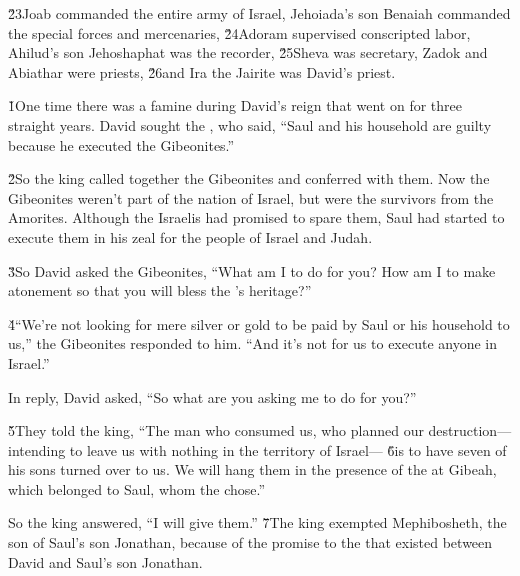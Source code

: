 \v{23}Joab commanded the entire army of Israel, Jehoiada's son Benaiah commanded the special forces and mercenaries, \v{24}Adoram supervised conscripted labor, Ahilud's son Jehoshaphat was the recorder, \v{25}Sheva was secretary, Zadok and Abiathar were priests, \v{26}and Ira the Jairite was David's priest.

\v{1}One time there was a famine during David's reign that went on for three straight years. David sought the , who said, ``Saul and his household are guilty because he executed the Gibeonites.''

\v{2}So the king called together the Gibeonites and conferred with them. Now the Gibeonites weren't part of the nation of Israel, but were the survivors from the Amorites. Although the Israelis had promised to spare them, Saul had started to execute them in his zeal for the people of Israel and Judah.

\v{3}So David asked the Gibeonites, ``What am I to do for you? How am I to make atonement so that you will bless the 's heritage?''

\v{4}``We're not looking for mere silver or gold to be paid by Saul or his household to us,'' the Gibeonites responded to him. ``And it's not for us to execute anyone in Israel.''

In reply, David asked, ``So what are you asking me to do for you?''

\v{5}They told the king, ``The man who consumed us, who planned our destruction---intending to leave us with nothing in the territory of Israel--- \v{6}is to have seven of his sons turned over to us. We will hang them in the presence of the  at Gibeah, which belonged to Saul, whom the  chose.''

So the king answered, ``I will give them.'' \v{7}The king exempted Mephibosheth, the son of Saul's son Jonathan, because of the promise to the  that existed between David and Saul's son Jonathan.

